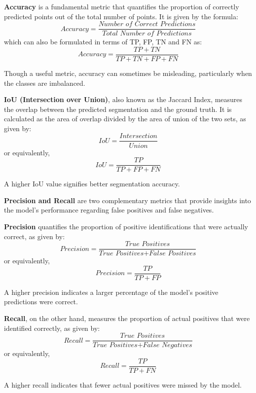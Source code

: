 \documentclass[11pt, a4paper,oneside,chapterprefix=false]{scrbook}
\begin{document}
\textbf{Accuracy} is a fundamental metric that quantifies the proportion of correctly predicted points out of the total number of points. It is given by the formula:
\[
    \textit{Accuracy} = \frac{\textit{Number of Correct Predictions}}{\textit{Total Number of Predictions}}
\]
which can also be formulated in terms of TP, FP, TN and FN as:
\[
    \textit{Accuracy} = \frac{TP + TN}{TP + TN + FP + FN}
\]

Though a useful metric, accuracy can sometimes be misleading, particularly when the classes are imbalanced.

\vspace{10pt}

\textbf{IoU (Intersection over Union)}, also known as the Jaccard Index, measures the overlap between the predicted segmentation and the ground truth. It is calculated as the area of overlap divided by the area of union of the two sets, as given by:
\[
    IoU = \frac{\textit{Intersection}}{\textit{Union}}
\]
or equivalently,
\[
    IoU = \frac{TP}{TP + FP + FN}
\]

A higher IoU value signifies better segmentation accuracy.

\vspace{10pt}

\textbf{Precision and Recall} are two complementary metrics that provide insights into the model's performance regarding false positives and false negatives. 

\vspace{10pt}

\textbf{Precision} quantifies the proportion of positive identifications that were actually correct, as given by:
\[
    \textit{Precision} = \frac{\textit{True Positives}}{\textit{True Positives} + \textit{False Positives}}
\]
or equivalently,
\[
    \textit{Precision} = \frac{TP}{TP + FP}
\]

A higher precision indicates a larger percentage of the model's positive predictions were correct.

\vspace{10pt}

\textbf{Recall}, on the other hand, measures the proportion of actual positives that were identified correctly, as given by:
\[
    \textit{Recall} = \frac{\textit{True Positives}}{\textit{True Positives} + \textit{False Negatives}}
\]
or equivalently,
\[
    \textit{Recall} = \frac{TP}{TP + FN}
\]

A higher recall indicates that fewer actual positives were missed by the model.
\end{document}
